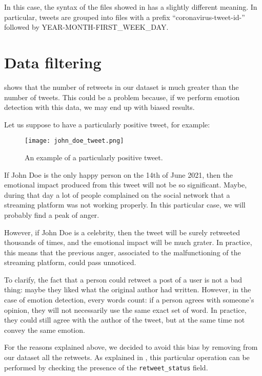 In this case, the syntax of the files showed in  has a slightly different meaning. In particular, tweets are grouped into files with a prefix “coronavirus-tweet-id-” followed by YEAR-MONTH-FIRST\_WEEK\_DAY.

\section{Data filtering}
\label{sec:data-filtering}

 shows that the number of retweets in our dataset is much greater than the number of tweets. This could be a problem because, if we perform emotion detection with this data, we may end up with biased results. 

Let us suppose to have a particularly positive tweet, for example:

\begin{figure}[H]
	\centering
    	\texttt{[image: john\_doe\_tweet.png]}
    	\caption{An example of a particularly positive tweet.}
    	\label{fig:tweet-example}
\end{figure}

If John Doe is the only happy person on the 14th of June 2021, then the emotional impact produced from this tweet will not be so significant. Maybe, during that day a lot of people complained on the social network that a streaming platform was not working properly. In this particular case, we will probably find a peak of anger.

However, if John Doe is a celebrity, then the tweet will be surely retweeted thousands of times, and the emotional impact will be much grater. In practice, this means that the previous anger, associated to the malfunctioning of the streaming platform, could pass unnoticed.

To clarify, the fact that a person could retweet a post of a user is not a bad thing: maybe they liked what the original author had written. However, in the case of emotion detection, every words count: if a person agrees with someone's opinion, they will not necessarily use the same exact set of word. In practice, they could still agree with the author of the tweet, but at the same time not convey the same emotion.

For the reasons explained above, we decided to avoid this bias by removing from our dataset all the retweets. As explained in , this particular operation can be performed by checking the presence of the \texttt{retweet\_status} field. 


